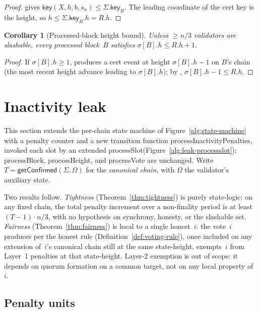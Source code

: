 \ifx\litemode\undefined\documentclass{article}\fi
\newcommand{\key}{\mathsf{key}}
\newcommand{\processSlot}{\textsf{processSlot}\xspace}
\newcommand{\processBlock}{\textsf{processBlock}\xspace}
\newcommand{\processHeight}{\textsf{processHeight}\xspace}
\newcommand{\processVote}{\textsf{processVote}\xspace}
\newcommand{\processInactivityPenalties}{\textsf{processInactivityPenalties}\xspace}
\newcommand{\getConfirmed}{\textsf{getConfirmed}\xspace}
\theoremstyle{plain}
\newtheorem{corollary}{Corollary}
\theoremstyle{definition}
\theoremstyle{remark}
\begin{document}
\begin{proof}
 gives $\key(X, h, b, s_n) \leq \Sigma.\key_R$. The leading coordinate of the cert key is the height, so $h \leq \Sigma.\key_R.h = R.h$.
\end{proof}

\begin{corollary}[Processed-block height bound]\label{rev:cor:processed-height-bound}
Unless $\geq n/3$ validators are slashable, every processed block~$B$ satisfies $\sigma[B].h \leq R.h + 1$.
\end{corollary}

\begin{proof}
If $\sigma[B].h \geq 1$,  produces a cert event at height $\sigma[B].h - 1$ on $B$'s chain (the most recent height advance leading to $\sigma[B].h$); by , $\sigma[B].h - 1 \leq R.h$.
\end{proof}

\section{Inactivity leak}

This section extends the per-chain state machine of Figure~\ref{alg:state-machine} with a penalty counter and a new transition function \processInactivityPenalties, invoked each slot by an extended \processSlot (Figure~\ref{alg:leak-processslot}); \processBlock, \processHeight, and \processVote are unchanged.
Write $T = \getConfirmed(\Sigma, \Omega)$ for the \emph{canonical chain}, with $\Omega$ the validator's auxiliary state.

Two results follow.
\emph{Tightness} (Theorem~\ref{thm:tightness}) is purely state-logic: on any fixed chain, the total penalty increment over a non-finality period is at least $(T-1) \cdot n/3$, with no hypothesis on synchrony, honesty, or the slashable set.
\emph{Fairness} (Theorem~\ref{thm:fairness}) is local to a single honest~$i$: the vote~$i$ produces per the honest rule (Definition~\ref{def:voting-rule}), once included on any extension of~$i$'s canonical chain still at the same state-height, exempts~$i$ from Layer~1 penalties at that state-height.
Layer-2 exemption is out of scope: it depends on quorum formation on a common target, not on any local property of~$i$.

\subsection{Penalty units}
\end{document}
